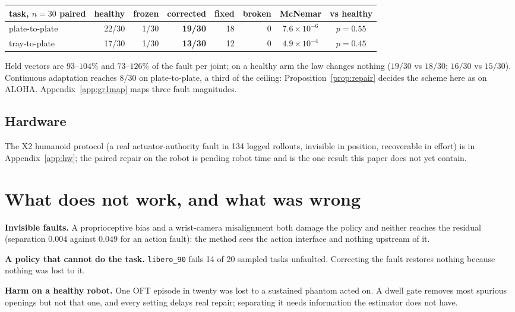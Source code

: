 \documentclass{article}
\newcommand{\code}[1]{\texttt{\small #1}}
\begin{document}
\begin{center}\small
\begin{tabular}{lrrrrrcc}
\toprule
task, $n=30$ paired & healthy & frozen & corrected & fixed & broken & McNemar & vs healthy \\
\midrule
plate-to-plate & 22/30 & 1/30 & \textbf{19/30} & 18 & 0 & $7.6\times10^{-6}$ & $p=0.55$ \\
tray-to-plate & 17/30 & 1/30 & \textbf{13/30} & 12 & 0 & $4.9\times10^{-4}$ & $p=0.45$ \\
\bottomrule
\end{tabular}
\end{center}

Held vectors are $93$--$104\%$ and $73$--$126\%$ of the fault per joint; on a healthy arm
the law changes nothing ($19/30$ vs $18/30$; $16/30$ vs $15/30$). Continuous adaptation
reaches $8/30$ on plate-to-plate, a third of the ceiling: Proposition~\ref{prop:repair}
decides the scheme here as on ALOHA. Appendix~\ref{app:gr1map} maps three fault magnitudes.

\subsection{Hardware}
\label{sec:hardware}
The X2 humanoid protocol (a real actuator-authority fault in 134 logged rollouts, invisible in position, recoverable in effort) is in Appendix~\ref{app:hw}; the paired repair on the robot is pending robot time and is the one result this paper does not yet contain.

\section{What does not work, and what was wrong}
\label{sec:fail}

\textbf{Invisible faults.} A proprioceptive bias and a wrist-camera misalignment both
damage the policy and neither reaches the residual (separation $0.004$ against $0.049$ for
an action fault): the method sees the action interface and nothing upstream of it.

\textbf{A policy that cannot do the task.} \code{libero\_90} fails 14 of 20 sampled tasks
unfaulted. Correcting the fault restores nothing because nothing was lost to it.

\textbf{Harm on a healthy robot.} One OFT episode in twenty was lost to a sustained phantom
acted on. A dwell gate removes most spurious openings but not that one, and every setting
delays real repair; separating it needs information the estimator does not have.
\end{document}
